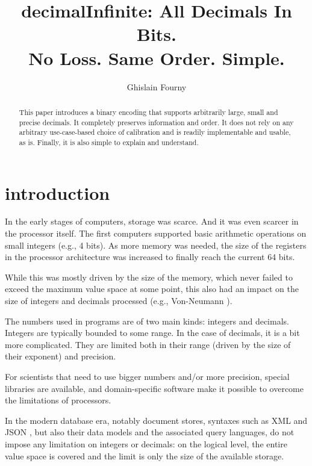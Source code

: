 \documentclass[final,leqno,onefignum,onetabnum]{siamltex1213}
\begin{document}
\title{decimalInfinite: All Decimals In Bits.\\ No Loss. Same Order. Simple.}

\author{
Ghislain Fourny\\
}
\maketitle

\begin{abstract}
This paper introduces a binary encoding that supports arbitrarily large, small and precise decimals. It completely preserves information and order. It does not rely on any arbitrary use-case-based choice of calibration and is readily implementable and usable, as is. Finally, it is also simple to explain and understand.
\end{abstract}

\section{introduction}
In the early stages of computers, storage was scarce. And it was even scarcer in the processor itself. The first computers supported basic arithmetic operations on small integers (e.g., 4 bits). As more memory was needed, the size of the registers in the processor architecture was increased to finally reach the current 64 bits.

While this was mostly driven by the size of the memory, which never failed to exceed the maximum value space at some point, this also had an impact on the size of integers and decimals processed (e.g., Von-Neumann \cite{VonNeumann1946}).

The numbers used in programs are of two main kinds: integers and decimals. Integers are typically bounded to some range. In the case of decimals, it is a bit more complicated. They are limited both in their range (driven by the size of their exponent) and precision.

For scientists that need to use bigger numbers and/or more precision, special libraries are available, and domain-specific software \cite{MAPLE} \cite{MATHEMATICA} \cite{MATLAB} make it possible to overcome the limitations of processors.

In the modern database era, notably document stores, syntaxes such as XML \cite{XML} and JSON \cite{JSON}, but also their data models and the associated query languages, do not impose any limitation on integers or decimals: on the logical level, the entire value space is covered and the limit is only the size of the available storage.
\end{document}

